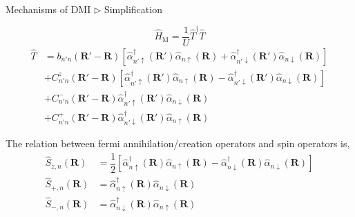 \documentclass{beamer}
\begin{document}
  \begin{frame}{Mechanisms of DMI \(\rhd\) Simplification}
    \begin{block}{}
      \begin{equation*}
        \widehat{H}_{\text{M}} = \frac{1}{U}\widehat{T}^\dagger\widehat{T}
      \end{equation*}
      \begin{equation}
        \begin{aligned}
          \widehat{T} &= b_{n'n}(\bm{R}'-\bm{R})\left[\widehat{\alpha}_{n'\uparrow}^{\dagger}(\bm{R}')\widehat{\alpha}_{n\uparrow}(\bm{R}) + \widehat{\alpha}_{n'\downarrow}^{\dagger}(\bm{R}')\widehat{\alpha}_{n\downarrow}(\bm{R})\right]\\
          &+ C_{n'n}^{z}(\bm{R}'-\bm{R})\left[\widehat{\alpha}_{n'\uparrow}^{\dagger}(\bm{R}')\widehat{\alpha}_{n\uparrow}(\bm{R}) - \widehat{\alpha}_{n'\downarrow}^{\dagger}(\bm{R}')\widehat{\alpha}_{n\downarrow}(\bm{R})\right]\\
          &+ C_{n'n}^{-}(\bm{R}'-\bm{R})\widehat{\alpha}_{n'\uparrow}^{\dagger}(\bm{R}')\widehat{\alpha}_{n\downarrow}(\bm{R})\\
          &+ C_{n'n}^{+}(\bm{R}'-\bm{R})\widehat{\alpha}_{n'\downarrow}^{\dagger}(\bm{R}')\widehat{\alpha}_{n\uparrow}(\bm{R})
        \end{aligned}
      \end{equation}
    \end{block}
    The relation between fermi annihilation/creation
    operators and spin operators is, 
    \begin{subequations}
      \begin{align}
        \widehat{S}_{z,n}(\bm{R}) &= \dfrac{1}{2}\left[\widehat{\alpha}_{n\uparrow}^\dagger(\bm{R})\widehat{\alpha}_{n\uparrow}(\bm{R}) - \widehat{\alpha}_{n\downarrow}^\dagger(\bm{R})\widehat{\alpha}_{n\downarrow}(\bm{R})\right]\\
        \widehat{S}_{+,n}(\bm{R}) &= \widehat{\alpha}_{n\uparrow}^\dagger(\bm{R})\widehat{\alpha}_{n\downarrow}(\bm{R})\\
        \widehat{S}_{-,n}(\bm{R}) &= \widehat{\alpha}_{n\downarrow}^\dagger(\bm{R})\widehat{\alpha}_{n\uparrow}(\bm{R})
      \end{align}
    \end{subequations}
  \end{frame}
\end{document}
